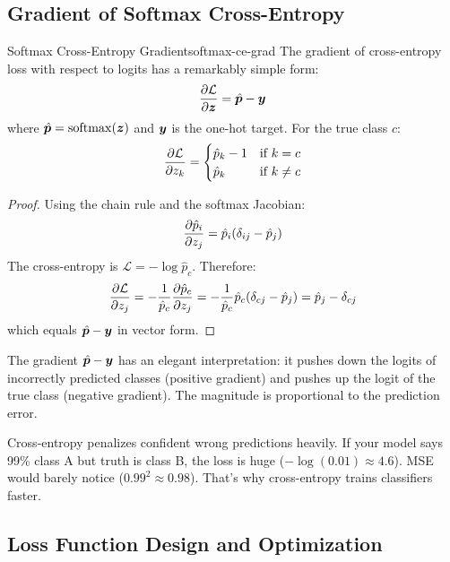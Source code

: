 \documentclass[../../main.tex]{subfiles}
\begin{document}
\subsection{Gradient of Softmax Cross-Entropy}

\begin{theorem}{Softmax Cross-Entropy Gradient}{softmax-ce-grad}
The gradient of cross-entropy loss with respect to logits has a remarkably simple form:
\[
    \frac{\partial \mathcal{L}}{\partial \boldsymbol{z}} = \hat{\boldsymbol{p}} - \boldsymbol{y}
\]
where $\hat{\boldsymbol{p}} = \operatorname{softmax}(\boldsymbol{z})$ and $\boldsymbol{y}$ is the one-hot target. For the true class $c$:
\[
    \frac{\partial \mathcal{L}}{\partial z_k} = \begin{cases}
        \hat{p}_k - 1 & \text{if } k = c \\
        \hat{p}_k & \text{if } k \neq c
    \end{cases}
\]
\end{theorem}

\begin{proof}
Using the chain rule and the softmax Jacobian:
\[
    \frac{\partial \hat{p}_i}{\partial z_j} = \hat{p}_i (\delta_{ij} - \hat{p}_j)
\]
The cross-entropy is $\mathcal{L} = -\log \hat{p}_c$. Therefore:
\[
    \frac{\partial \mathcal{L}}{\partial z_j} = -\frac{1}{\hat{p}_c} \frac{\partial \hat{p}_c}{\partial z_j} = -\frac{1}{\hat{p}_c} \hat{p}_c (\delta_{cj} - \hat{p}_j) = \hat{p}_j - \delta_{cj}
\]
which equals $\hat{\boldsymbol{p}} - \boldsymbol{y}$ in vector form.
\end{proof}

\begin{intuition}
The gradient $\hat{\boldsymbol{p}} - \boldsymbol{y}$ has an elegant interpretation: it pushes down the logits of incorrectly predicted classes (positive gradient) and pushes up the logit of the true class (negative gradient). The magnitude is proportional to the prediction error.
\end{intuition}

\begin{aha}
Cross-entropy penalizes confident wrong predictions heavily. If your model says 99\% class A but truth is class B, the loss is huge ($-\log(0.01) \approx 4.6$). MSE would barely notice ($0.99^2 \approx 0.98$). That's why cross-entropy trains classifiers faster.
\end{aha}

\subsection{Loss Function Design and Optimization}
\label{sec:loss-design-optimization}
\end{document}
